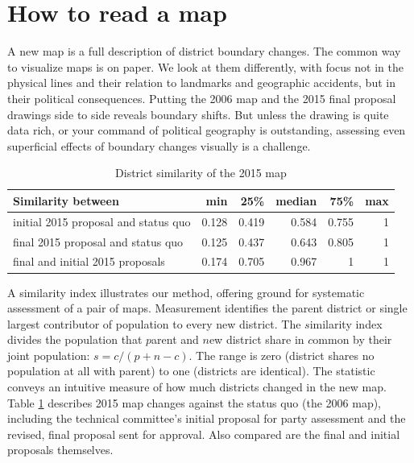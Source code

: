 \documentclass[letter,12pt]{article}
\begin{document}
\section{How to read a map}

A new map is a full description of district boundary changes. The common way to visualize maps is on paper. We look at them differently, with focus not in the physical lines and their relation to landmarks and geographic accidents, but in their political consequences. Putting the 2006 map and the 2015 final proposal drawings side to side reveals boundary shifts. But unless the drawing is quite data rich, or your command of political geography is outstanding, assessing even superficial effects of boundary changes visually is a challenge. 

\begin{table}
\begin{center}
  \begin{tabular}{lrrrrr}
  Similarity between                   &   min  &  25\%  & median &  75\% &  max \\ \hline
  initial 2015 proposal and status quo & 0.128  & 0.419  & 0.584  & 0.755 &  1   \\
  final 2015 proposal and status quo   & 0.125  & 0.437  & 0.643  & 0.805 &  1   \\
  final and initial 2015 proposals     & 0.174  & 0.705  & 0.967  & 1     &  1   \\
  \end{tabular}
  \caption{District similarity of the 2015 map}\label{T:simIndex}
\end{center}
\end{table}

A similarity index \citep[][:15--7]{cox.katz.2002} illustrates our method, offering ground for systematic assessment of a pair of maps. Measurement identifies the parent district or single largest contributor of population to every new district. The $s$imilarity index divides the population that $p$arent and $n$ew district share in $c$ommon by their joint population: $s = c / (p + n - c)$. The range is zero (district shares no population at all with parent) to one (districts are identical). The statistic conveys an intuitive measure of how much districts changed in the new map. Table \ref{T:simIndex} describes 2015 map changes against the status quo (the 2006 map), including the technical committee's initial proposal for party assessment and the revised, final proposal sent for approval. Also compared are the final and initial proposals themselves. %
\end{document}
